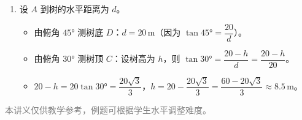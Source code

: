 \documentclass[12pt, a4paper]{ctexart}
\begin{document}
\begin{knowledgebox}[参考答案]
\begin{enumerate}
  \item 设 $A$ 到树的水平距离为 $d$。
  \begin{itemize}[nosep]
    \item 由俯角 $45°$ 测树底 $D$：$d=20\,\text{m}$（因为 $\tan45°=\dfrac{20}{d}$）。
    \item 由俯角 $30°$ 测树顶 $C$：设树高为 $h$，则 $\tan30°=\dfrac{20-h}{d}=\dfrac{20-h}{20}$。
    \item $20-h=20\tan30°=\dfrac{20\sqrt{3}}{3}$，$h=20-\dfrac{20\sqrt{3}}{3}=\dfrac{60-20\sqrt{3}}{3}\approx\boxed{8.5}\,\text{m}$。
  \end{itemize}
\end{enumerate}
\end{knowledgebox}

\vfill
\begin{center}
\small\textcolor{gray}{本讲义仅供教学参考，例题可根据学生水平调整难度。}
\end{center}
\end{document}
